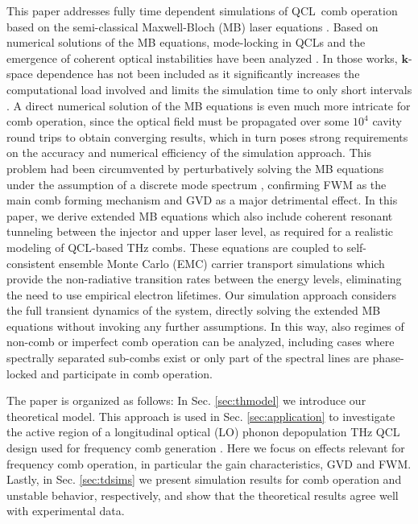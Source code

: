 \documentclass[10pt]{article}
\def\bm{\mathbf}
\begin{document}
	This paper addresses fully time dependent simulations of QCL\ comb operation
	based on the semi-classical Maxwell-Bloch (MB) laser equations
	\cite{boyd2003nonlinear}. Based on numerical solutions of the MB equations,
	mode-locking in QCLs and the emergence of coherent optical instabilities have
	been analyzed
	\cite{wang2007coherent,gordon2008multimode,gkortsas2010dynamics,talukder2010self,wang2015active,vukovic2016multimode}. In those works, $\bm{k}$-space dependence has not been included as it significantly increases the computational load involved and limits the simulation time to only short intervals \cite{weber2006theory}. A direct numerical solution of the MB equations is even much more intricate for
	comb operation, since the optical field must be propagated over some $10^{4}$
	cavity round trips to obtain converging results, which in turn poses strong
	requirements on the accuracy and numerical efficiency of the simulation
	approach. This problem had been circumvented by perturbatively solving the MB
	equations under the assumption of a discrete mode spectrum
	\cite{khurgin2014coherent,villares2015quantum}, confirming FWM as the main
	comb forming mechanism and GVD as a major detrimental effect. In this paper,
	we derive extended MB equations which also include coherent resonant tunneling
	between the injector and upper laser level, as required for a realistic
	modeling of QCL-based THz combs. These equations are coupled to
	self-consistent ensemble Monte Carlo (EMC) carrier transport simulations which
	provide the non-radiative transition rates between the energy levels,
	eliminating the need to use empirical electron lifetimes. Our simulation
	approach considers the full transient dynamics of the system, directly solving
	the extended MB equations without invoking any further assumptions. In this
	way, also regimes of non-comb or imperfect comb operation can be analyzed,
	including cases where spectrally separated sub-combs exist or only part of the
	spectral lines are phase-locked and participate in comb operation.
	
	The paper is organized as follows: In Sec. \ref{sec:thmodel} we introduce our
	theoretical model. This approach is used in Sec. \ref{sec:application} to
	investigate the active region of a longitudinal optical (LO) phonon
	depopulation THz QCL design used for frequency comb generation
	\cite{burghoff2014terahertz}. Here we focus on effects relevant for frequency
	comb operation, in particular the gain characteristics, GVD and FWM. Lastly,
	in Sec. \ref{sec:tdsims} we present simulation results for comb
	operation and unstable behavior, respectively, and show that the theoretical
	results agree well with experimental data.
	
\end{document}
